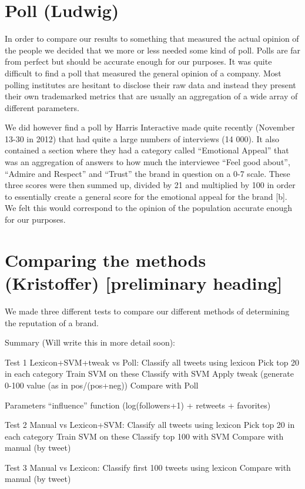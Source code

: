 \documentclass[a4paper,11pt]{report}
\begin{document}
\section{Poll (Ludwig)}
In order to compare our results to something that measured the actual opinion of the people we decided that we more or less needed some kind of poll. 
Polls are far from perfect but should be accurate enough for our purposes. It was quite difficult to find a poll that measured the general opinion of a company. 
Most polling institutes are hesitant to disclose their raw data and instead they present their own trademarked metrics that are usually an aggregation of a wide array of different parameters.

We did however find a poll by Harris Interactive made quite recently (November 13-30 in 2012) that had quite a large numbers of interviews (14 000). 
It also contained a section where they had a category called “Emotional Appeal” that was an aggregation of answers to how much the interviewee “Feel good about”, “Admire and Respect” and “Trust” the brand in question on a 0-7 scale. 
These three scores were then summed up, divided by 21 and multiplied by 100 in order to essentially create a general score for the emotional appeal for the brand [b]. 
We felt this would correspond to the opinion of the population accurate enough for our purposes.

\section{Comparing the methods (Kristoffer) [preliminary heading]}
We made three different tests to compare our different methods of determining the reputation of a brand.




Summary (Will write this in more detail soon):

Test 1 Lexicon+SVM+tweak vs Poll:
Classify all tweets using lexicon
Pick top 20 in each category
Train SVM on these
Classify with SVM
Apply tweak (generate 0-100 value (as in pos/(pos+neg))
Compare with Poll

Parameters
“influence” function (log(followers+1) + retweets + favorites)


Test 2 Manual vs Lexicon+SVM:
Classify all tweets using lexicon
Pick top 20 in each category
Train SVM on these
Classify top 100 with SVM
Compare with manual (by tweet)


Test 3 Manual vs Lexicon:
Classify first 100 tweets using lexicon
Compare with manual (by tweet)
\end{document}
